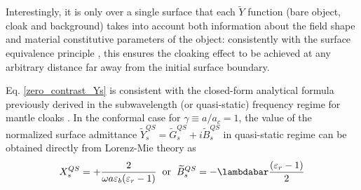 \documentclass[reprint, showpacs, amsmath,amssymb, aps,
prb]{revtex4-1}
\begin{document}
Interestingly, it is only over a single surface that each $\widetilde{Y}$ function (bare object, cloak and background) takes into account both information about the field shape and material constitutive parameters of the object: consistently with the surface equivalence principle  \cite{Schelkunoff_1}, this ensures the cloaking effect to be achieved at any arbitrary distance far away from the initial surface boundary. 
%
%

Eq. \eqref{zero_contrast_Ys} is consistent with the closed-form analytical formula previously derived in the subwavelength (or quasi-static) frequency regime for mantle cloaks \cite{MC,Patt_Meta,Fost_Meta}. In the conformal case for $\gamma\equiv a/a_c=1$, the value of the normalized surface admittance $\widetilde{Y}_s^{QS}=\widetilde{G}_s^{QS}+i\widetilde{B}_s^{QS}$ in quasi-static regime can be obtained directly from Lorenz-Mie theory as\cite{MC,Patt_Meta}
% 
\begin{align}
X_s^{QS}=+\dfrac{2}{\omega a \varepsilon_b (\varepsilon_r-1)} \hspace{2mm}  \mbox{or} \hspace{2mm} \widetilde{B}_s^{QS} =- \lambdabar\dfrac{(\varepsilon_r-1)}{2} 
\label{qs_formula} 
\end{align}
%
 
\end{document}
